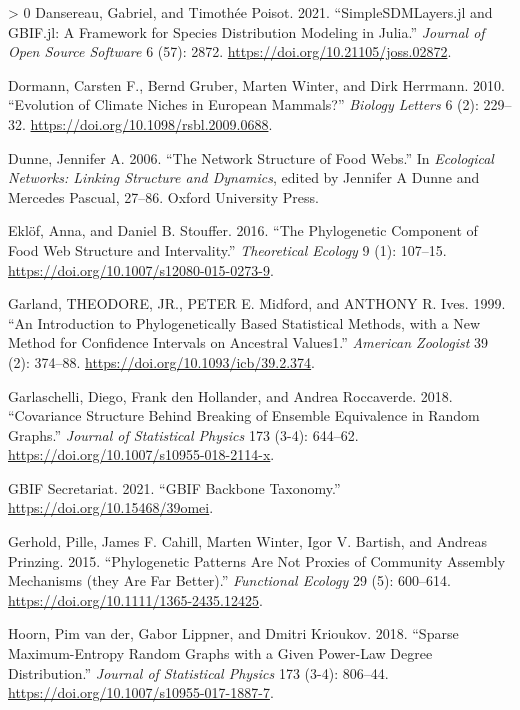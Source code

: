 \documentclass[10pt,oneside]{article}
\newlength{\cslhangindent}
\newenvironment{CSLReferences}[3] %
 {%
  \setlength{\parindent}{0pt}
  \ifodd #1 \everypar{\setlength{\hangindent}{\cslhangindent}}\ignorespaces\fi
  \ifnum #2 > 0
  \setlength{\parskip}{#2\baselineskip}
  \fi
 }%
 {}
\begin{document}
\begin{CSLReferences}{1}{0}
\leavevmode\hypertarget{ref-Dansereau2021SimJl}{}%
Dansereau, Gabriel, and Timothée Poisot. 2021. {``SimpleSDMLayers.jl and
GBIF.jl: A Framework for Species Distribution Modeling in Julia.''}
\emph{Journal of Open Source Software} 6 (57): 2872.
\url{https://doi.org/10.21105/joss.02872}.

\leavevmode\hypertarget{ref-Dormann2010EvoCli}{}%
Dormann, Carsten F., Bernd Gruber, Marten Winter, and Dirk Herrmann.
2010. {``Evolution of Climate Niches in European Mammals?''}
\emph{Biology Letters} 6 (2): 229--32.
\url{https://doi.org/10.1098/rsbl.2009.0688}.

\leavevmode\hypertarget{ref-Dunne2006NetStr}{}%
Dunne, Jennifer A. 2006. {``The Network Structure of Food Webs.''} In
\emph{Ecological Networks: Linking Structure and Dynamics}, edited by
Jennifer A Dunne and Mercedes Pascual, 27--86. Oxford University Press.

\leavevmode\hypertarget{ref-Eklof2016PhyCom}{}%
Eklöf, Anna, and Daniel B. Stouffer. 2016. {``The Phylogenetic Component
of Food Web Structure and Intervality.''} \emph{Theoretical Ecology} 9
(1): 107--15. \url{https://doi.org/10.1007/s12080-015-0273-9}.

\leavevmode\hypertarget{ref-Garland1999IntPhy}{}%
Garland, THEODORE, JR., PETER E. Midford, and ANTHONY R. Ives. 1999.
{``An Introduction to Phylogenetically Based Statistical Methods, with a
New Method for Confidence Intervals on Ancestral Values1.''}
\emph{American Zoologist} 39 (2): 374--88.
\url{https://doi.org/10.1093/icb/39.2.374}.

\leavevmode\hypertarget{ref-Garlaschelli2018CovStr}{}%
Garlaschelli, Diego, Frank den Hollander, and Andrea Roccaverde. 2018.
{``Covariance Structure Behind Breaking of Ensemble Equivalence in
Random Graphs.''} \emph{Journal of Statistical Physics} 173 (3-4):
644--62. \url{https://doi.org/10.1007/s10955-018-2114-x}.

\leavevmode\hypertarget{ref-GBIFSecretariat2021GbiBac}{}%
GBIF Secretariat. 2021. {``GBIF Backbone Taxonomy.''}
\url{https://doi.org/10.15468/39omei}.

\leavevmode\hypertarget{ref-Gerhold2015PhyPat}{}%
Gerhold, Pille, James F. Cahill, Marten Winter, Igor V. Bartish, and
Andreas Prinzing. 2015. {``Phylogenetic Patterns Are Not Proxies of
Community Assembly Mechanisms (they Are Far Better).''} \emph{Functional
Ecology} 29 (5): 600--614.
\url{https://doi.org/10.1111/1365-2435.12425}.

\leavevmode\hypertarget{ref-vanderHoorn2018SpaMax}{}%
Hoorn, Pim van der, Gabor Lippner, and Dmitri Krioukov. 2018. {``Sparse
Maximum-Entropy Random Graphs with a Given Power-Law Degree
Distribution.''} \emph{Journal of Statistical Physics} 173 (3-4):
806--44. \url{https://doi.org/10.1007/s10955-017-1887-7}.


\end{CSLReferences}
\end{document}
